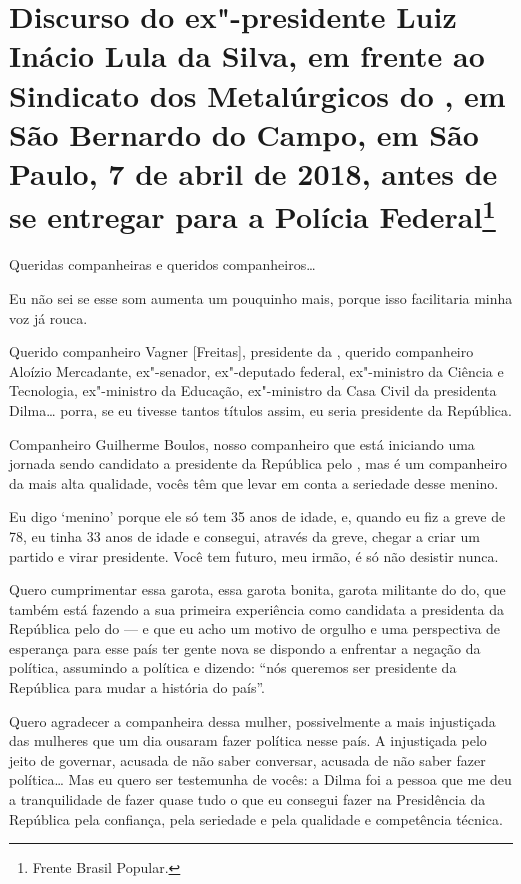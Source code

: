 \chapter*{Discurso do ex"-presidente Luiz Inácio Lula da Silva, em frente ao
Sindicato dos Metalúrgicos do , em São Bernardo do Campo, em São
Paulo, 7 de abril de 2018, antes de se entregar para a Polícia Federal\footnote{Frente Brasil Popular.}}


Queridas companheiras e queridos companheiros\ldots{}

Eu não sei se esse som aumenta um pouquinho mais, porque isso
facilitaria minha voz já rouca.

Querido companheiro Vagner [Freitas], presidente da ,
querido companheiro Aloízio Mercadante, ex"-senador, ex"-deputado federal,
ex"-ministro da Ciência e Tecnologia, ex"-ministro da Educação,
ex"-ministro da Casa Civil da presidenta Dilma\ldots{} porra, se eu tivesse
tantos títulos assim, eu seria presidente da República.

Companheiro Guilherme Boulos, nosso companheiro que está iniciando
uma jornada sendo candidato a presidente da República pelo , mas é
um companheiro da mais alta qualidade, vocês têm que levar em conta
a seriedade desse menino.

Eu digo `menino' porque ele só tem 35 anos de idade, e, quando eu
fiz a greve de 78, eu tinha 33 anos de idade e consegui, através da
greve, chegar a criar um partido e virar presidente. Você tem futuro,
meu irmão, é só não desistir nunca.

Quero cumprimentar essa garota, essa garota bonita, garota
militante do do, que também está fazendo a sua primeira experiência
como candidata a presidenta da República pelo do --- e que eu acho
um motivo de orgulho e uma perspectiva de esperança para esse país ter
gente nova se dispondo a enfrentar a negação da política, assumindo a
política e dizendo: ``nós queremos ser presidente da República para mudar
a história do país''.

Quero agradecer a companheira dessa mulher, possivelmente a mais
injustiçada das mulheres que um dia ousaram fazer política nesse país. A
injustiçada pelo jeito de governar, acusada de não saber conversar,
acusada de não saber fazer política\ldots{} Mas eu quero ser testemunha de
vocês: a Dilma foi a pessoa que me deu a tranquilidade de fazer quase
tudo o que eu consegui fazer na Presidência da República pela confiança,
pela seriedade e pela qualidade e competência técnica.


